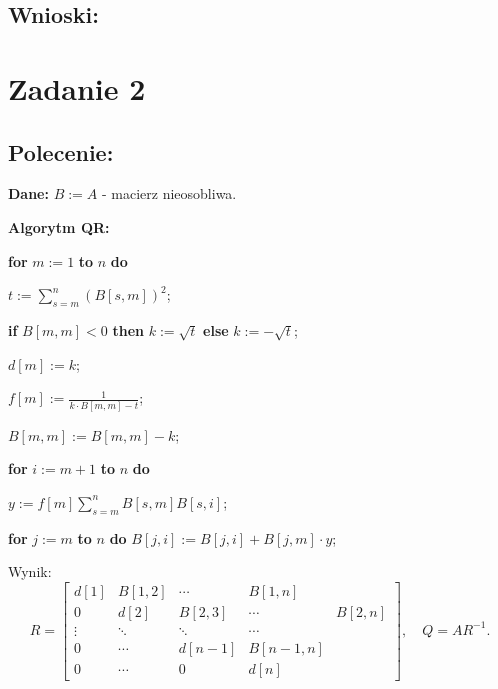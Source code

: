 \documentclass[a4paper, 11pt]{article}
\begin{document}
\subsection{Wnioski:}

\section{Zadanie 2}
\subsection{Polecenie:}
\noindent \textbf{Dane:} \( B := A \) - macierz nieosobliwa.

\begin{center} \textbf{Algorytm QR:} \end{center}
\begin{algindent}
    \item \textbf{for} \( m := 1 \) \textbf{to} \( n \) \textbf{do}
    \item \hspace{1.5em} \( t := \sum_{s=m}^n (B[s, m])^2 \);
    \item \hspace{1.5em} \textbf{if} \( B[m, m] < 0 \) \textbf{then} \( k := \sqrt{t} \) \textbf{else} \( k := -\sqrt{t} \);
    \item \hspace{1.5em} \( d[m] := k \);
    \item \hspace{1.5em} \( f[m] := \frac{1}{k \cdot B[m, m] - t} \);
    \item \hspace{1.5em} \( B[m, m] := B[m, m] - k \);
    \item \hspace{1.5em} \textbf{for} \( i := m+1 \) \textbf{to} \( n \) \textbf{do}
    \item \hspace{3em} \( y := f[m] \sum_{s=m}^n B[s, m] B[s, i] \);
    \item \hspace{3em} \textbf{for} \( j := m \) \textbf{to} \( n \) \textbf{do} \( B[j, i] := B[j, i] + B[j, m] \cdot y \);
\end{algindent}

\noindent Wynik:
\[
R = \begin{bmatrix}
d[1] & B[1, 2] & \cdots & B[1, n] \\
0 & d[2] & B[2, 3] & \cdots & B[2, n] \\
\vdots & \ddots & \ddots & \cdots \\
0 & \cdots & d[n-1] & B[n-1, n] \\
0 & \cdots & 0 & d[n]
\end{bmatrix}, \quad Q = A R^{-1}.
\]
\end{document}
